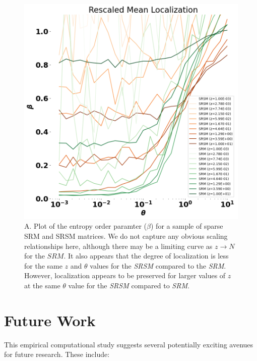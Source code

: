\documentclass{article}
\begin{document}
\begin{figure}
\begin{center}
	\includegraphics[width=\textwidth]{Figures/sparse_RSM_RBM_localization.png}
\end{center}
\caption{
A. Plot of the entropy order paramter ($\beta$) for a sample of sparse SRM and SRSM matrices. 
We do not capture any obvious scaling relationships here, although there may be a limiting curve as $z\rightarrow N$ for the $SRM$.
It also appears that the degree of localization is less for the same $z$ and $\theta$ values for the \textit{SRSM} compared to the \textit{SRM}.
However, localization appears to be preserved for larger values of $z$ at the same $\theta$ value for the \textit{SRSM} compared to \textit{SRM}.
}
\label{fig:sparse_RSM_RBM_collapse}
\end{figure}


\section{Future Work}

This empirical computational study suggests several potentially exciting avenues for future research. These include:
\end{document}

